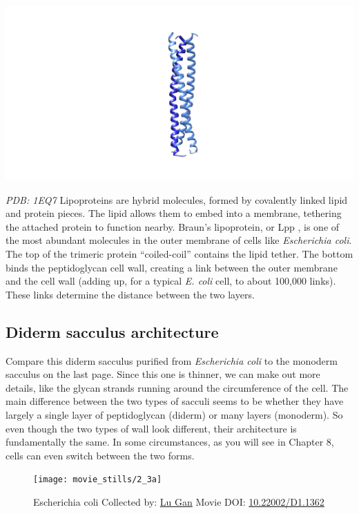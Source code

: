 \documentclass[]{tufte-book}
\begin{document}
\includegraphics{img/schematics/2_3_1}

\emph{PDB: 1EQ7} Lipoproteins are hybrid molecules, formed by covalently
linked lipid and protein pieces. The lipid allows them to embed into a
membrane, tethering the attached protein to function nearby. Braun's
lipoprotein, or Lpp \citep{shu2000}, is one of the most abundant
molecules in the outer membrane of cells like \emph{Escherichia coli}.
The top of the trimeric protein ``coiled-coil'' contains the lipid
tether. The bottom binds the peptidoglycan cell wall, creating a link
between the outer membrane and the cell wall (adding up, for a typical
\emph{E. coli} cell, to about 100,000 links). These links determine the
distance between the two layers.

\hypertarget{Diderm_sacculus_architecture}{\subsection{Diderm sacculus
architecture}\label{Diderm_sacculus_architecture}}

Compare this diderm sacculus purified from \emph{Escherichia coli} to
the monoderm sacculus on the last page. Since this one is thinner, we
can make out more details, like the glycan strands running around the
circumference of the cell. The main difference between the two types of
sacculi seems to be whether they have largely a single layer of
peptidoglycan (diderm) or many layers (monoderm). So even though the two
types of wall look different, their architecture is fundamentally the
same. In some circumstances, as you will see in Chapter 8, cells can
even switch between the two forms.





\begin{figure}
\texttt{[image: movie\_stills/2\_3a]} \caption[Escherichia coli Collected by: \protect\hyperlink{lu_gan}{Lu
Gan} Movie DOI:
\href{https://doi.org/10.22002/D1.1362}{10.22002/D1.1362}]{Escherichia coli Collected by: \protect\hyperlink{lu_gan}{Lu
Gan} Movie DOI:
\href{https://doi.org/10.22002/D1.1362}{10.22002/D1.1362}}\label{fig:2-3a}
\end{figure}
\end{document}
